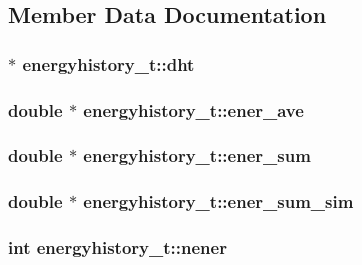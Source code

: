 \subsection{\-Member \-Data \-Documentation}
\hypertarget{structenergyhistory__t_a2f8ee0472c718380c016997c6061f235}{
\subsubsection[{dht}]{ $\ast$ {\bf energyhistory\-\_\-t\-::dht}}}\label{structenergyhistory__t_a2f8ee0472c718380c016997c6061f235}
\hypertarget{structenergyhistory__t_aba6fcf4db2d0ee6a1825e41582d89807}{
\subsubsection[{ener\-\_\-ave}]{\setlength{\rightskip}{0pt plus 5cm}double $\ast$ {\bf energyhistory\-\_\-t\-::ener\-\_\-ave}}}\label{structenergyhistory__t_aba6fcf4db2d0ee6a1825e41582d89807}
\hypertarget{structenergyhistory__t_a6e0b61f3b01fa758428f3cac33d58be4}{
\subsubsection[{ener\-\_\-sum}]{\setlength{\rightskip}{0pt plus 5cm}double $\ast$ {\bf energyhistory\-\_\-t\-::ener\-\_\-sum}}}\label{structenergyhistory__t_a6e0b61f3b01fa758428f3cac33d58be4}
\hypertarget{structenergyhistory__t_a36ac6002bc27d5e176c96fc44045525a}{
\subsubsection[{ener\-\_\-sum\-\_\-sim}]{\setlength{\rightskip}{0pt plus 5cm}double $\ast$ {\bf energyhistory\-\_\-t\-::ener\-\_\-sum\-\_\-sim}}}\label{structenergyhistory__t_a36ac6002bc27d5e176c96fc44045525a}
\hypertarget{structenergyhistory__t_a53713219d19942d602f7222fb905b706}{
\subsubsection[{nener}]{\setlength{\rightskip}{0pt plus 5cm}int {\bf energyhistory\-\_\-t\-::nener}}}\label{structenergyhistory__t_a53713219d19942d602f7222fb905b706}
